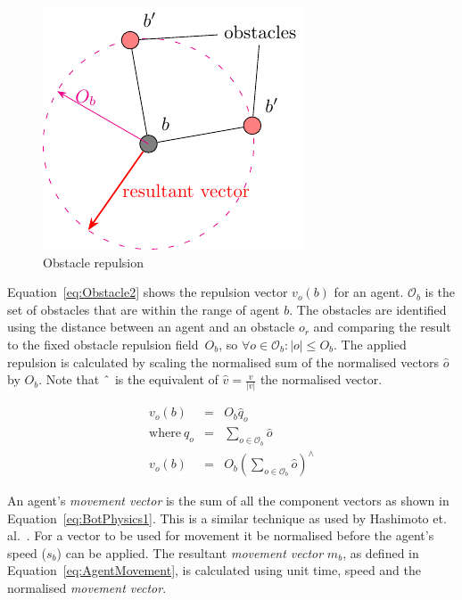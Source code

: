 \documentclass[preprint,12pt]{elsarticle}
\newcommand{\magn}[1]{\vert{#1}\vert}
\begin{document}
\begin{figure}
\begin{center}
\includegraphics{figures/obstacles}
\end{center}
\caption{Obstacle repulsion \label{fig:Obstacle1}}
\end{figure}

Equation~\ref{eq:Obstacle2} shows the repulsion vector $v_o(b)$ for an agent.
$\mathcal O_b$ is the set of obstacles that are within the range of agent $b$.
The obstacles are identified using the distance between an agent and an
obstacle $o_r$ and comparing the result to the fixed obstacle repulsion
field~$O_b$, so $\forall o \in \mathcal O_b : \magn{o}\leq O_b$.
The applied repulsion is calculated by scaling the normalised sum of the
normalised vectors $\hat o$ by $O_b$.  Note that $\string^$ is the equivalent
of $\hat v = \frac{v}{\magn{v}}$ the normalised vector.

\begin{eqnarray}\label{eq:Obstacle2}
  v_o(b) & = & O_b \hat q_o \\
	\mathrm{where~}  q_o & = & \sum_{o\in \mathcal O_b } \hat o
	\nonumber \\
	v_o(b) & = & O_b \left(\sum_{o\in \mathcal O_b }\hat o\right)^{\!\!\wedge} \nonumber
\end{eqnarray}

An agent's \textit{movement vector} is the sum of all the component vectors as
shown in Equation~\ref{eq:BotPhysics1}. This is a similar technique as used by
Hashimoto et. al.~\cite{HAY:08}. For a vector to be used for movement it be
normalised before the agent's speed ($s_b$)  can be applied. The resultant
\textit{movement vector} $m_b$, as defined in Equation~\ref{eq:AgentMovement}, is calculated using unit time, speed and the normalised \textit{movement vector}.
\end{document}

